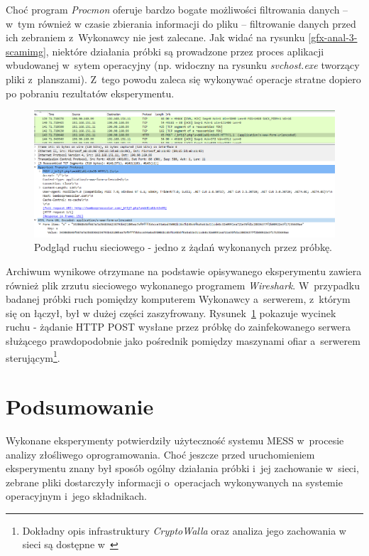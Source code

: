 \documentclass[a4paper,12pt,oneside]{article}
\begin{document}
	Choć program \textit{Procmon} oferuje bardzo bogate możliwości filtrowania danych -- w~tym również w czasie zbierania informacji do pliku -- filtrowanie danych przed ich zebraniem z~Wykonawcy nie jest zalecane. Jak widać na rysunku \ref{gfx-anal-3-scamimg}, niektóre działania próbki są prowadzone przez proces aplikacji wbudowanej w~sytem operacyjny (np. widoczny na rysunku \textit{svchost.exe} tworzący pliki z~planszami). Z~tego powodu zaleca się wykonywać operacje stratne dopiero po pobraniu rezultatów eksperymentu.
	
	\begin{figure}[ht]
		\includegraphics[scale=0.44]{gfx/anal-4-wireshark.PNG}
		\caption{Podgląd ruchu sieciowego - jedno z żądań wykonanych przez próbkę.}
		\label{gfx-anal-4-wireshark}
	\end{figure}	
	
	Archiwum wynikowe otrzymane na podstawie opisywanego eksperymentu zawiera również plik zrzutu sieciowego wykonanego programem \textit{Wireshark}. W~przypadku badanej próbki ruch pomiędzy komputerem Wykonawcy a~serwerem, z~którym się on łączył, był w dużej części zaszyfrowany. Rysunek~\ref{gfx-anal-4-wireshark} pokazuje wycinek ruchu - żądanie HTTP POST wysłane przez próbkę do zainfekowanego serwera służącego prawdopodobnie jako pośrednik pomiędzy maszynami ofiar a~serwerem sterującym\footnote{Dokładny opis infrastruktury \textit{CryptoWalla} oraz analiza jego zachowania w sieci są dostępne w~\cite{cryptowall-analysis}}.
	
	\clearpage
	\newpage
	
	\section{Podsumowanie}
	
	Wykonane eksperymenty potwierdziły użyteczność systemu MESS w~procesie analizy złośliwego oprogramowania. Choć jeszcze przed uruchomieniem eksperymentu znany był sposób ogólny działania próbki i~jej zachowanie w~sieci, zebrane pliki dostarczyły informacji o~operacjach wykonywanych na systemie operacyjnym i~jego składnikach. 
	
\end{document}
